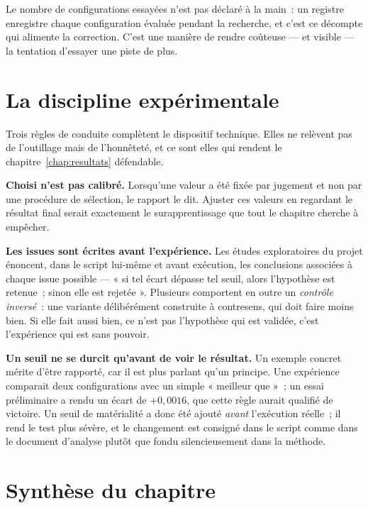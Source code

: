 Le nombre de configurations essayées n'est pas déclaré à la main~: un registre
enregistre chaque configuration évaluée pendant la recherche, et c'est ce
décompte qui alimente la correction. C'est une manière de rendre coûteuse — et
visible — la tentation d'essayer une piste de plus.

\section{La discipline expérimentale}

Trois règles de conduite complètent le dispositif technique. Elles ne relèvent
pas de l'outillage mais de l'honnêteté, et ce sont elles qui rendent le
chapitre~\ref{chap:resultats} défendable.

\textbf{Choisi n'est pas calibré.} Lorsqu'une valeur a été fixée par jugement et
non par une procédure de sélection, le rapport le dit. Ajuster ces valeurs en
regardant le résultat final serait exactement le surapprentissage que tout le
chapitre cherche à empêcher.

\textbf{Les issues sont écrites avant l'expérience.} Les études exploratoires du
projet énoncent, dans le script lui-même et avant exécution, les conclusions
associées à chaque issue possible — « si tel écart dépasse tel seuil, alors
l'hypothèse est retenue~; sinon elle est rejetée ». Plusieurs comportent en outre
un \emph{contrôle inversé}~: une variante délibérément construite à contresens,
qui doit faire moins bien. Si elle fait aussi bien, ce n'est pas l'hypothèse qui
est validée, c'est l'expérience qui est sans pouvoir.

\textbf{Un seuil ne se durcit qu'avant de voir le résultat.} Un exemple concret
mérite d'être rapporté, car il est plus parlant qu'un principe. Une expérience
comparait deux configurations avec un simple « meilleur que »~; un essai
préliminaire a rendu un écart de $+0{,}0016$, que cette règle aurait qualifié de
victoire. Un seuil de matérialité a donc été ajouté \emph{avant} l'exécution
réelle~; il rend le test plus sévère, et le changement est consigné dans le
script comme dans le document d'analyse plutôt que fondu silencieusement dans la
méthode.

\section*{Synthèse du chapitre}

